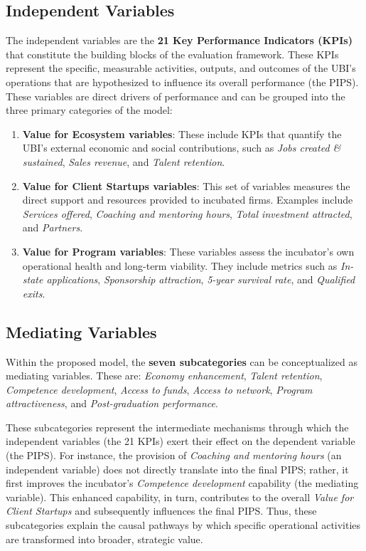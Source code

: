 \documentclass[../Main.tex]{subfiles}
\begin{document}
\subsection{Independent Variables}
The independent variables are the \textbf{21 Key Performance Indicators (KPIs)} that constitute the building blocks of the evaluation framework. These KPIs represent the specific, measurable activities, outputs, and outcomes of the UBI's operations that are hypothesized to influence its overall performance (the PIPS). These variables are direct drivers of performance and can be grouped into the three primary categories of the model:
\begin{enumerate}
    \item \textbf{Value for Ecosystem variables}: These include KPIs that quantify the UBI's external economic and social contributions, such as \textit{Jobs created \& sustained}, \textit{Sales revenue}, and \textit{Talent retention}.
    \item \textbf{Value for Client Startups variables}: This set of variables measures the direct support and resources provided to incubated firms. Examples include \textit{Services offered}, \textit{Coaching and mentoring hours}, \textit{Total investment attracted}, and \textit{Partners}.
    \item \textbf{Value for Program variables}: These variables assess the incubator's own operational health and long-term viability. They include metrics such as \textit{In-state applications}, \textit{Sponsorship attraction}, \textit{5-year survival rate}, and \textit{Qualified exits}.
\end{enumerate}

\subsection{Mediating Variables}
Within the proposed model, the \textbf{seven subcategories} can be conceptualized as mediating variables. These are: \textit{Economy enhancement}, \textit{Talent retention}, \textit{Competence development}, \textit{Access to funds}, \textit{Access to network}, \textit{Program attractiveness}, and \textit{Post-graduation performance}.

These subcategories represent the intermediate mechanisms through which the independent variables (the 21 KPIs) exert their effect on the dependent variable (the PIPS). For instance, the provision of \textit{Coaching and mentoring hours} (an independent variable) does not directly translate into the final PIPS; rather, it first improves the incubator's \textit{Competence development} capability (the mediating variable). This enhanced capability, in turn, contributes to the overall \textit{Value for Client Startups} and subsequently influences the final PIPS. Thus, these subcategories explain the causal pathways by which specific operational activities are transformed into broader, strategic value.
\end{document}
